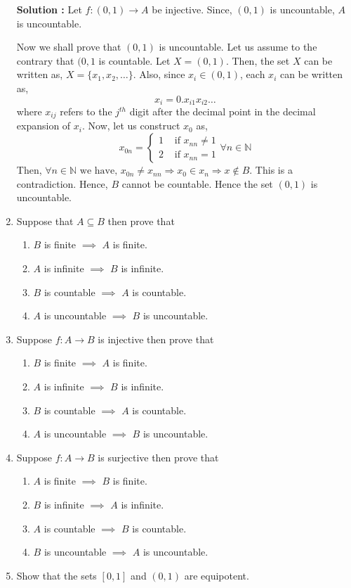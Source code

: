 \documentclass[10pt]{article}
\newcommand{\nn}{\mathbb{N}}
\begin{document}
\begin{enumerate}
	    \textbf{Solution :} Let $f : (0, 1) \to A$ be injective. Since, $(0, 1)$ is uncountable,
	    $A$ is uncountable.

	    Now we shall prove that $(0, 1)$ is uncountable. Let us assume to the contrary that $(0, 1$ is countable.
	    Let $X = (0, 1)$. Then, the set $X$ can be written as, $X = \{ x_1, x_2, \dots \}$. Also, since $x_i \in (0, 1)$, each $x_i$ can be written as,
	    $$x_i = 0.x_{i1}x_{i2} \dots $$ where $x_{ij}$ refers to the $j^{th}$ digit after the decimal point in the decimal
	    expansion of $x_i$.
	    Now, let us construct $x_0$ as,
	    \begin{equation*}
		    x_{0n} = 
		    \begin{cases}
			    1 & \text{ if } x_{nn} \neq 1 \\
			    2 & \text{ if } x_{nn} = 1
		    \end{cases}
		    \forall n \in \nn
	    \end{equation*}
	    Then, $\forall n \in \nn \text{ we have, } x_{0n} \neq x_{nn} \Rightarrow x_0 \in x_n \Rightarrow x \notin B$. This is a contradiction. Hence, $B$ cannot be countable.
	    Hence the set $(0, 1)$ is uncountable.


    \item Suppose that $A \subseteq B$ then prove that 
    \begin{enumerate}
        \item $B$ is finite $\implies$ $A$ is finite.
        \item $A$ is infinite $\implies$ $B$ is infinite.
        \item $B$ is countable $\implies$ $A$ is countable.
        \item $A$ is uncountable $\implies$ $B$ is uncountable.
    \end{enumerate}
    \item Suppose $f : A \to B$ is injective then prove that 
    \begin{enumerate}
        \item $B$ is finite $\implies$ $A$ is finite.
        \item $A$ is infinite $\implies$ $B$ is infinite.
        \item $B$ is countable $\implies$ $A$ is countable.
        \item $A$ is uncountable $\implies$ $B$ is uncountable.
    \end{enumerate}
    \item Suppose $f : A \to B$ is surjective then prove that 
    \begin{enumerate}
        \item $A$ is finite $\implies$ $B$ is finite.
        \item $B$ is infinite $\implies$ $A$ is infinite.
        \item $A$ is countable $\implies$ $B$ is countable.
        \item $B$ is uncountable $\implies$ $A$ is uncountable.
    \end{enumerate}
    \item Show that the sets $[0, 1]$ and $(0, 1)$ are equipotent.
    

\end{enumerate}
\end{document}
